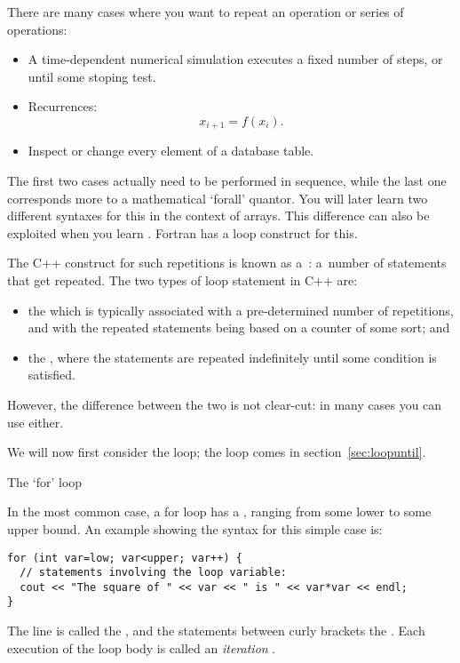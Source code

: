 
There are many cases where you want to repeat an operation or series
of operations:
\begin{itemize}
\item A time-dependent numerical simulation executes a fixed number of
  steps, or until some stoping test.
\item Recurrences: \[ x_{i+1} = f(x_i). \]
\item Inspect or change every element of a database table.
\end{itemize}

The first two cases actually need to be performed in sequence, while
the last one corresponds more to a mathematical `forall' quantor. You
will later learn two different syntaxes for this in the context of arrays.
This
difference can also be exploited when you learn
. Fortran has a
 loop construct for this.

The C++ construct for such repetitions
is known as a~: a~number of
statements that get repeated. The two types of loop statement in C++ are:
\begin{itemize}
\item the  which is typically associated with
  a pre-determined number of repetitions, and with the repeated
  statements being based on a counter of some sort; and
\item the , where the statements are
  repeated indefinitely until some condition is satisfied.
\end{itemize}
However, the difference between the two is not clear-cut: in many
cases you can use either.

We will now first consider the  loop; the  loop comes in
section~\ref{sec:loopuntil}.

 {The `for' loop}
\label{sec:for}

In the most common case, a for loop has a
, ranging from some lower to some upper
bound. An example showing the syntax for this simple case is:
\begin{lstlisting}
for (int var=low; var<upper; var++) {
  // statements involving the loop variable:
  cout << "The square of " << var << " is " << var*var << endl;
}
\end{lstlisting}
The  line is called the , and the
statements between curly brackets the .
Each execution of the loop body is called an
%
\emph{iteration}%
%
%
.

